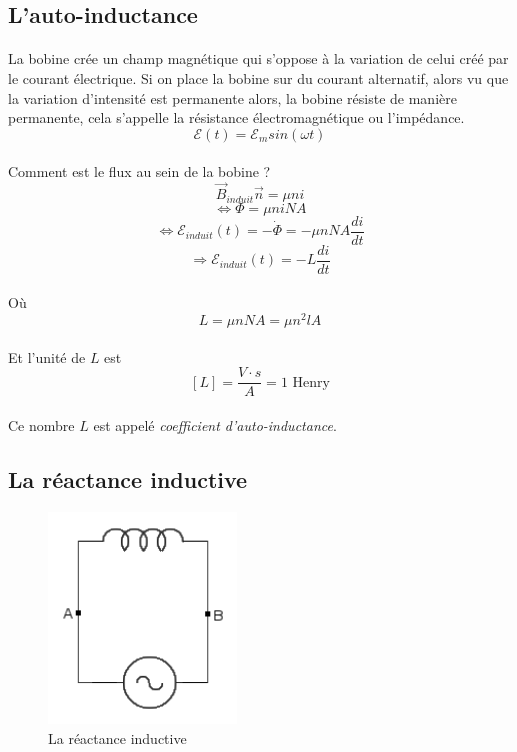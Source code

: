 \documentclass[a4paper]{article}
\begin{document}
\subsection{L'auto-inductance}
\paragraph{}La bobine crée un champ magnétique qui s'oppose à la variation de celui créé par le courant électrique. Si on place la bobine sur du courant alternatif, alors vu que la variation d'intensité est permanente alors, la bobine résiste de manière permanente, cela s'appelle la résistance électromagnétique ou l'impédance.
\[\mathscr{E}(t)=\mathscr{E}_msin(\omega t)\]
\paragraph{}Comment est le flux au sein de la bobine ?
\[\vec{B}_{induit}\vec{n}=\mu n i\]
\[\Leftrightarrow \Phi=\mu niNA\]
\[\Leftrightarrow \mathscr{E}_{induit}(t)=-\dot{\Phi}=-\mu nNA\frac{di}{dt}\]
\[\Rightarrow \mathscr{E}_{induit}(t)=-L\frac{di}{dt}\]
\paragraph{}Où
\[L=\mu nNA=\mu n^2lA\]
\paragraph{}Et l'unité de $L$ est
\[[L]=\frac{V\cdot s}{A}=1\text{ Henry}\]
\paragraph{}Ce nombre $L$ est appelé \textit{coefficient d'auto-inductance}.
\subsection{La réactance inductive}
\begin{figure}
\begin{center}
\includegraphics[width=5cm]{imgs/em_1.png}
\end{center}
\caption{La réactance inductive}
\label{La réactance inductive}
\end{figure}
\end{document}
